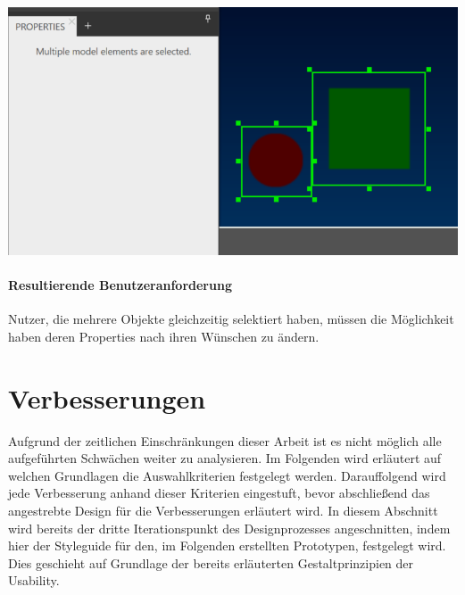\begin{center}
  \includegraphics[scale=0.8]{figures/Mehrfachselektion.png}
  \label{fig:Mehrfachselektion}
\end{center}

\paragraph{Resultierende Benutzeranforderung}
Nutzer, die mehrere Objekte gleichzeitig selektiert haben, müssen die Möglichkeit haben deren Properties nach ihren Wünschen zu ändern.

\section{Verbesserungen}
Aufgrund der zeitlichen Einschränkungen dieser Arbeit ist es nicht möglich alle aufgeführten Schwächen weiter zu analysieren. 
Im Folgenden wird erläutert auf welchen Grundlagen die Auswahlkriterien festgelegt werden.
Darauffolgend wird jede Verbesserung anhand dieser Kriterien eingestuft, bevor abschließend das angestrebte Design für die Verbesserungen erläutert wird.
In diesem Abschnitt wird bereits der dritte Iterationspunkt des Designprozesses angeschnitten, indem hier der Styleguide für den, im Folgenden erstellten Prototypen, festgelegt wird. Dies geschieht auf Grundlage der bereits erläuterten Gestaltprinzipien der Usability.

